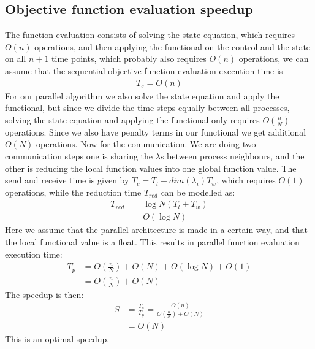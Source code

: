 \subsection{Objective function evaluation speedup}
The function evaluation consists of solving the state equation, which requires $O(n)$ operations, and then applying the functional on the control and the state on all $n+1$ time points, which probably also requires $O(n)$ operations, we can assume that the sequential objective function evaluation execution time is 
\begin{align*}
T_s = O(n)
\end{align*}
For our parallel algorithm we also solve the state equation and apply the functional, but since we divide the time steps equally between all processes, solving the state equation and applying the functional only requires $O(\frac{n}{N})$ operations. Since we also have penalty terms in our functional we get additional $O(N)$ operations. Now for the communication. We are doing two communication steps one is sharing the $\lambda$s between process neighbours, and the other is reducing the local function values into one global function value. The send and receive time is given by $T_c = T_l + \textit{dim}(\lambda_i)T_w$, which requires $O(1)$ operations, while the reduction time $T_{red}$ can be modelled as:
\begin{align*}
T_{red} &= \log N (T_l+T_w) \\
&= O(\log N)
\end{align*} 
Here we assume that the parallel architecture is made in a certain way, and that the local functional value is a float. This results in parallel function evaluation execution time:
\begin{align*}
T_p &= O(\frac{n}{N}) +O(N) + O(\log N) + O(1) \\
&=O(\frac{n}{N}) +O(N)
\end{align*}
The speedup is then:
\begin{align*}
S &= \frac{T_s}{T_p} = \frac{O(n)}{O(\frac{n}{N}) +O(N)} \\
&=O(N)
\end{align*}
This is an optimal speedup.
